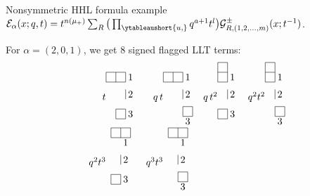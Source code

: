 \documentclass[dvipsnames]{beamer}
\newcommand{\Gcal}{{\mathcal G}}
\newcommand{\Ecal}{\mathcal{E}}
\theoremstyle{definition}
\newcounter{c}
\begin{document}
\begin{frame}{Nonsymmetric HHL formula example}
  \(\Ecal_\alpha(x;q,t) = t^{n(\mu_+)} \sum_R
  \big( \prod_{\ytableaushort{u,{}}} q^{a+1} t^l\big)
        \Gcal^\pm_{R,(1,2,\ldots,m)}(x;t^{-1})\).\pause

  For \(\alpha = (2,0,1)\), we get 8 signed flagged LLT terms:
  \begin{equation*}
\setlength{\arraycolsep}{0cm}
\begin{array}{rcrcrcrcrcrcrcrc}
t  &
\begin{tikzpicture}[scale=.35,baseline=.85cm]
  \draw[yshift=4.25cm] (-2,0) grid (0,1); \node at (.5,4.75) {1};
  \draw[yshift=2.5cm] (0,0) grid (0,1); \node at (.5,3) {2};
  \draw[yshift=.5cm] (-1,0) grid (0,1); \node at (.5,1) {3};
\end{tikzpicture}
& \quad   q\, t  &
\begin{tikzpicture}[scale=.35,baseline=.85cm]
  \draw[yshift=4.25cm] (-2,0) grid (0,1); \node at (.5,4.75) {1};
  \draw[yshift=2.5cm] (0,0) grid (0,1); \node at (.5,3) {2};
  \draw[yshift=.75cm] (0,0) grid (1,1); \node at (.5,.25) {3};
\end{tikzpicture}
& \quad  q\, t^{2} &
\begin{tikzpicture}[scale=.35,baseline=.85cm]
  \draw[yshift=4.25cm] (-1,0) grid (0,2); \node at (.5,4.75) {1};
  \draw[yshift=2.5cm] (0,0) grid (0,1); \node at (.5,3) {2};
  \draw[yshift=.5cm] (-1,0) grid (0,1); \node at (.5,1) {3};
\end{tikzpicture}
& \quad   q^{2} t^{2}  &
\begin{tikzpicture}[scale=.35,baseline=.85cm]
  \draw[yshift=4.25cm] (-1,0) grid (0,2); \node at (.5,4.75) {1};
  \draw[yshift=2.5cm] (0,0) grid (0,1); \node at (.5,3) {2};
  \draw[yshift=.75cm] (0,0) grid (1,1); \node at (.5,.25) {3};
\end{tikzpicture} \\
\quad  q^{2} t^{3} &
\begin{tikzpicture}[scale=.35,baseline=.85cm]
  \draw[yshift=4.25cm] (-1,1) grid (1,2); \node at (.5,4.75) {1};
  \draw[yshift=2.5cm] (0,0) grid (0,1); \node at (.5,3) {2};
  \draw[yshift=.5cm] (-1,0) grid (0,1); \node at (.5,1) {3};
\end{tikzpicture}
& \quad  q^{3} t^{3}  &
\begin{tikzpicture}[scale=.35,baseline=.85cm]
  \draw[yshift=4.25cm] (-1,1) grid (1,2); \node at (.5,4.75) {1};
  \draw[yshift=2.5cm] (0,0) grid (0,1); \node at (.5,3) {2};
  \draw[yshift=.75cm] (0,0) grid (1,1); \node at (.5,.25) {3};

\end{tikzpicture}
\end{array}
\end{equation*}
\end{frame}
\end{document}
